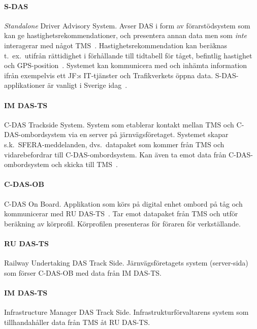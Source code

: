 \paragraph{S-DAS}
\emph{Standalone} Driver Advisory System.
Avser DAS i form av förarstödsystem som kan ge hastighetsrekommendationer, och presentera annan data men som \emph{inte} interagerar med något TMS~\cite{Joborn2023}.
Hastighetsrekommendation kan beräknas t.~ex.~utifrån rättidighet i förhållande till tidtabell för tåget, befintlig hastighet och GPS-position~\cite{Systemdefinition2019}.
Systemet kan kommunicera med och inhämta information ifrån exempelvis ett JF:s IT-tjänster och Trafikverkets öppna data.
S-DAS-applikationer är vanligt i Sverige idag~\cite{Systemdefinition2019}.
\paragraph{IM DAS-TS}
C-DAS Trackside System.
System som etablerar kontakt mellan TMS och C-DAS-ombordsystem via en server på järnvägsföretaget\cite{Olsson2023}.
Systemet skapar s.k.~SFERA-meddelanden, dvs.~datapaket som kommer från TMS och vidarebefordrar till C-DAS-ombordsystem.
Kan även ta emot data från C-DAS-ombordsystem och skicka till TMS\@~\cite{Olsson2023}.
\paragraph{C-DAS-OB}
C-DAS On Board.
Applikation som körs på digital enhet ombord på tåg och kommunicerar med RU DAS-TS\@~\cite{Olsson2023}.
Tar emot datapaket från TMS och utför beräkning av körprofil.
Körprofilen presenteras för föraren för verkställande.
\paragraph{RU DAS-TS}
Railway Undertaking DAS Track Side.
Järnvägsföretagets system (server-sida) som förser C-DAS-OB med data från IM DAS-TS\@.
\paragraph{IM DAS-TS}
Infrastructure Manager DAS Track Side.
Infrastrukturförvaltarens system som tillhandahåller data från TMS åt RU DAS-TS\@.
